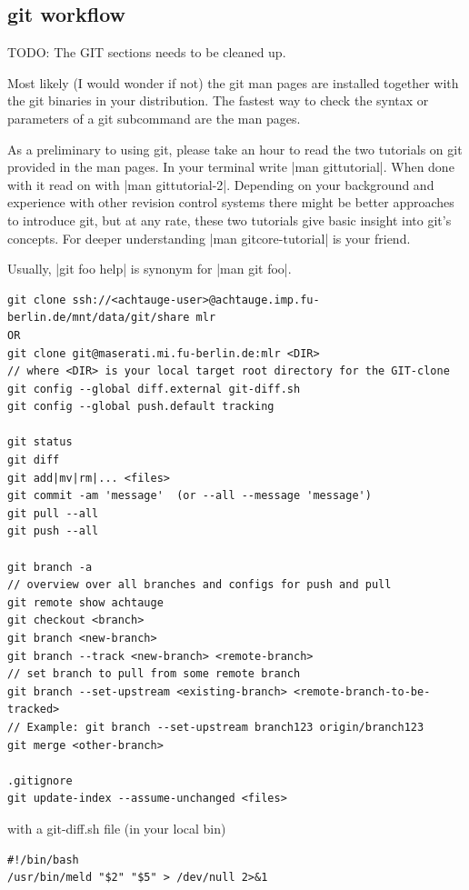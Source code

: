 \subsection{git workflow}\label{secGit}

TODO: The GIT sections needs to be cleaned up.

Most likely (I would wonder if not) the git man pages are installed
together with the git binaries in your distribution. The fastest way to
check the syntax or parameters of a git subcommand are the man pages. 

As a preliminary to using git, please take an hour to read the two
tutorials on git provided in the man pages. In your terminal write
|man gittutorial|. When done with it read on with %
%
|man gittutorial-2|. Depending on your background and experience
with other revision control systems there might be better approaches to
introduce git, but at any rate, these two tutorials give basic
insight into git's concepts. For deeper understanding %
%
|man gitcore-tutorial| is your friend.

Usually, |git foo help| is synonym for |man git foo|.

\begin{code}
\begin{verbatim}
git clone ssh://<achtauge-user>@achtauge.imp.fu-berlin.de/mnt/data/git/share mlr
OR
git clone git@maserati.mi.fu-berlin.de:mlr <DIR>
// where <DIR> is your local target root directory for the GIT-clone
git config --global diff.external git-diff.sh
git config --global push.default tracking

git status
git diff
git add|mv|rm|... <files>
git commit -am 'message'  (or --all --message 'message')
git pull --all
git push --all

git branch -a
// overview over all branches and configs for push and pull
git remote show achtauge
git checkout <branch>
git branch <new-branch>
git branch --track <new-branch> <remote-branch>
// set branch to pull from some remote branch
git branch --set-upstream <existing-branch> <remote-branch-to-be-tracked>
// Example: git branch --set-upstream branch123 origin/branch123
git merge <other-branch>

.gitignore
git update-index --assume-unchanged <files>
\end{verbatim}
\end{code}

with a git-diff.sh file (in your local bin)
\begin{code}
\begin{verbatim}
#!/bin/bash
/usr/bin/meld "$2" "$5" > /dev/null 2>&1
\end{verbatim}
\end{code}

